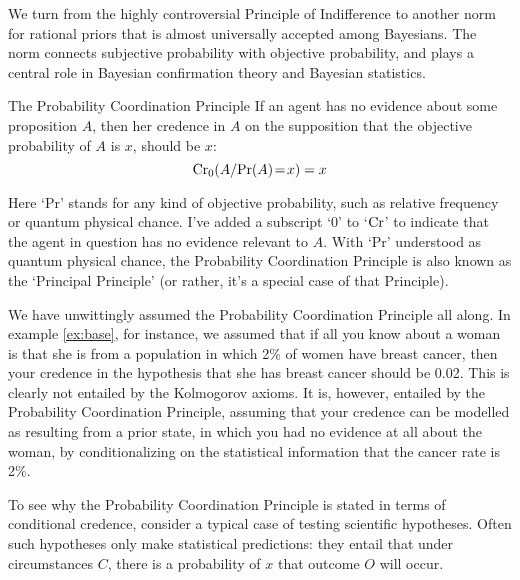 
We turn from the highly controversial Principle of Indifference to
another norm for rational priors that is almost universally accepted
among Bayesians. The norm connects subjective probability with
objective probability, and plays a central role in Bayesian
confirmation theory and Bayesian statistics.

\begin{genericthm}{The Probability Coordination Principle}
  If an agent has no evidence about some proposition $A$, then her
  credence in $A$ on the supposition that the objective probability of
  $A$ is $x$, should be $x$:
  \[
    \text{Cr}_0(A / \text{Pr}(A)\!=\!x) = x
  \]
\end{genericthm}
%
Here `Pr' stands for any kind of objective probability, such as
relative frequency or quantum physical chance. I've added a subscript
`0' to `$\text{Cr}$' to indicate that the agent in question has no evidence
relevant to $A$. With `Pr' understood as quantum physical chance, the
Probability Coordination Principle is also known as the `Principal
Principle' (or rather, it's a special case of that Principle).

We have unwittingly assumed the Probability Coordination Principle all
along. In example \ref{ex:base}, for instance, we assumed that if all you
know about a woman is that she is from a population in which 2\% of
women have breast cancer, then your credence in the hypothesis that she has
breast cancer should be 0.02. This is clearly not entailed by the
Kolmogorov axioms. It is, however, entailed by the Probability
Coordination Principle, assuming that your credence can be modelled as
resulting from a prior state, in which you had no evidence at all
about the woman, by conditionalizing on the statistical information
that the cancer rate is 2\%.

To see why the Probability Coordination Principle is stated in terms
of conditional credence, consider a typical case of testing scientific
hypotheses. Often such hypotheses only make statistical predictions:
they entail that under circumstances $C$, there is a probability of
$x$ that outcome $O$ will occur.

